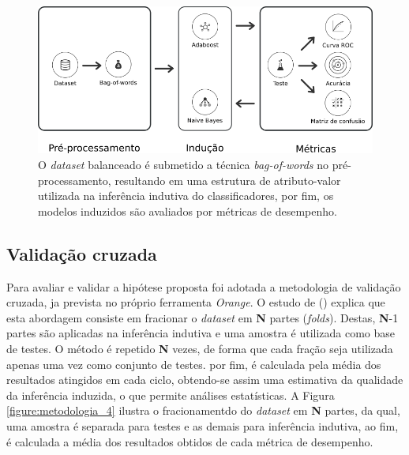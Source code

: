 \begin{figure}[H]
\begin{center}
    \includegraphics[scale=0.70]{images/metodologia_3.png}
\end{center}
\caption{O \textit{dataset} balanceado é submetido a técnica 
\textit{bag-of-words} no pré-processamento, resultando em uma estrutura de 
atributo-valor utilizada na inferência indutiva do classificadores, por fim, os 
modelos induzidos são avaliados por métricas de desempenho.}
\label{figure:metodologia_3}
\end{figure}

\subsection{Validação cruzada}
\label{subsection:validacao_cruzada}

Para avaliar e validar a hipótese proposta foi adotada a  metodologia de 
validação cruzada, ja prevista no próprio ferramenta \textit{Orange}. O estudo 
de  (\citeyear{tavares2007estudo}) explica 
que esta abordagem consiste em fracionar o \textit{dataset} em \textbf{N} 
partes (\textit{folds}). Destas, \textbf{N}-1 partes são aplicadas na inferência 
indutiva e uma amostra é utilizada como base de testes. O método é repetido 
\textbf{N} vezes, de forma que cada fração seja utilizada apenas uma vez como
conjunto de testes. por fim, é calculada pela média dos resultados atingidos em 
cada ciclo, obtendo-se assim uma estimativa da qualidade da inferência 
induzida, o que permite análises estatísticas. A Figura 
\ref{figure:metodologia_4} ilustra o fracionamentdo do \textit{dataset} em 
\textbf{N} partes, da qual, uma amostra é separada para testes e as demais para 
inferência indutiva, ao fim, é calculada a média dos resultados obtidos de 
cada métrica de desempenho. 

